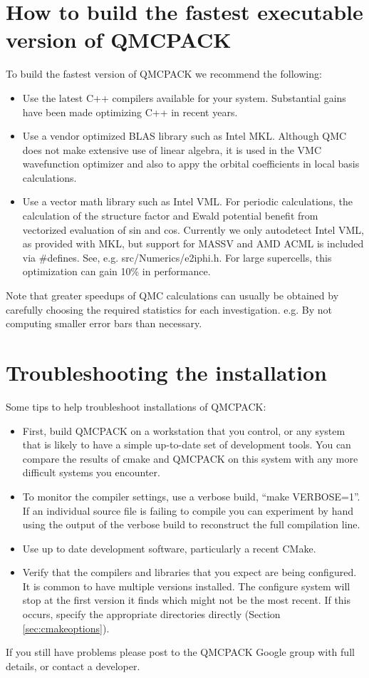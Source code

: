 \section{How to build the fastest executable version of QMCPACK}
\label{sec:buildperformance}
To build the fastest version of QMCPACK we recommend the following:
\begin{itemize}
\item Use the latest C++ compilers available for your
  system. Substantial gains have been made optimizing C++ in recent
  years.
\item Use a vendor optimized BLAS library such as Intel MKL. Although
  QMC does not make extensive use of linear algebra, it is used in the
  VMC wavefunction optimizer and also to appy the orbital coefficients in local basis
  calculations.
\item Use a vector math library such as Intel VML.  For periodic
  calculations, the calculation of the structure factor and Ewald
  potential benefit from vectorized evaluation of sin and
  cos. Currently we only autodetect Intel VML, as provided with MKL,
  but support for MASSV and AMD ACML is included via \#defines. See,
  e.g. src/Numerics/e2iphi.h. For
  large supercells, this optimization can gain 10\% in performance.
\end{itemize}

Note that greater speedups of QMC calculations can usually be obtained by
carefully choosing the required statistics for each
investigation. e.g. By not computing smaller error bars than necessary.

\section{Troubleshooting the installation}
\label{sec:troubleshoot}
Some tips to help troubleshoot installations of QMCPACK:
\begin{itemize}
\item First, build QMCPACK on a workstation that you control, or any
  system that is likely to have a simple up-to-date set of development
  tools. You can compare the results of cmake and QMCPACK on this
  system with any more difficult systems you encounter.
\item To monitor the compiler settings, use a verbose build, ``make
  VERBOSE=1''. If an individual source file is failing to compile you
  can experiment by hand using the output of the verbose build to
  reconstruct the full compilation line.
\item Use up to date development software, particularly a recent
  CMake. 
\item Verify that the compilers and libraries that you expect are
  being configured. It is common to have multiple versions
  installed. The configure system will stop at the first version it
  finds which might not be the most recent. If this occurs, specify the appropriate
  directories directly (Section \ref{sec:cmakeoptions}).
\end{itemize}

If you still have problems please post to the QMCPACK Google group with full
details, or contact a developer.
